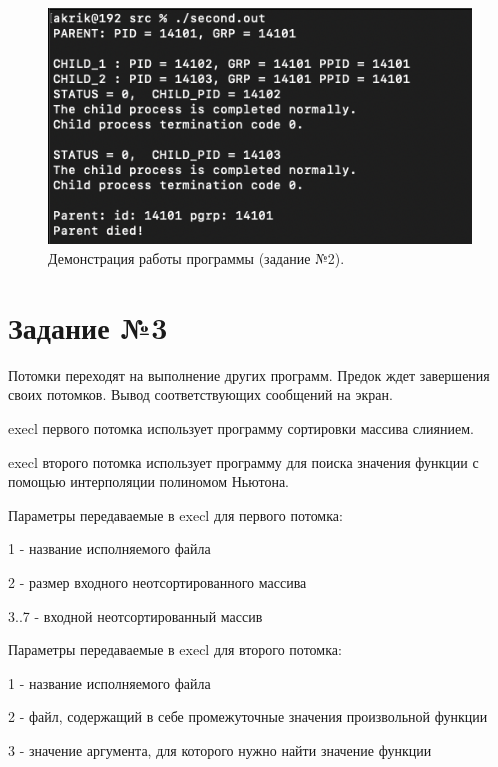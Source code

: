 \documentclass[12pt]{report}
\begin{document}
\begin{figure}[H]

	\centering

	\includegraphics[width=\linewidth]{img/second.png}
	\caption{Демонстрация работы программы (задание №2).}

	\label{fig:task02}

\end{figure}

\section*{Задание №3}

Потомки переходят на выполнение других программ. Предок ждет завершения своих потомков. Вывод соответствующих сообщений на экран.\newline

execl первого потомка использует программу сортировки массива слиянием.


execl второго потомка использует программу для поиска значения функции с помощью интерполяции полиномом Ньютона.\newline

Параметры передаваемые в execl для первого потомка:


1 - название исполняемого файла 


2 - размер входного неотсортированного массива


3..7 - входной неотсортированный массив\newline


Параметры передаваемые в execl для второго потомка:

1 - название исполняемого файла 

2 - файл, содержащий в себе промежуточные значения произвольной функции 

3 - значение аргумента, для которого нужно найти значение функции
\end{document}

